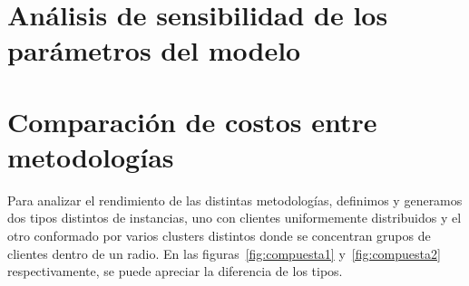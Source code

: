 \documentclass[10pt]{article}
\begin{document}
\section{Análisis de sensibilidad de los parámetros del modelo}


\section{Comparación de costos entre metodologías}
Para analizar el rendimiento de las distintas metodologías, definimos y generamos dos tipos distintos de instancias, uno con clientes uniformemente distribuidos y el otro conformado por varios clusters distintos donde se concentran grupos de clientes dentro de un radio. En las figuras~\ref{fig:compuesta1} y~\ref{fig:compuesta2} respectivamente, se puede apreciar la diferencia de los tipos.

\vspace{5mm}
\end{document}
